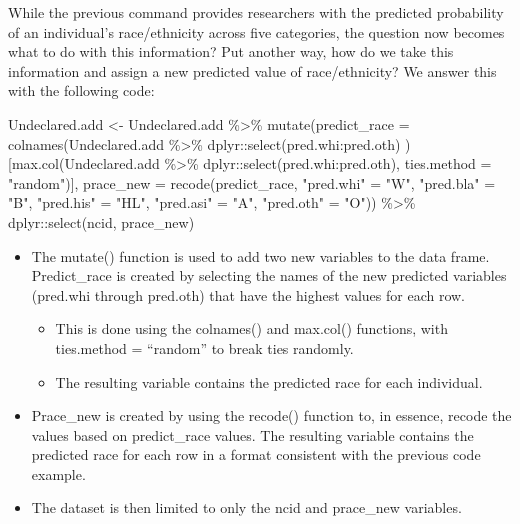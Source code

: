 \documentclass[
]{article}
\newenvironment{Shaded}{}{}
\newcommand{\AttributeTok}[1]{#1}
\newcommand{\FunctionTok}[1]{#1}
\newcommand{\NormalTok}[1]{#1}
\newcommand{\OtherTok}[1]{\textcolor[rgb]{1.00,0.25,0.00}{#1}}
\newcommand{\SpecialCharTok}[1]{\textcolor[rgb]{0.00,0.50,0.50}{#1}}
\newcommand{\StringTok}[1]{\textcolor[rgb]{0.00,0.50,0.50}{#1}}
\providecommand{\tightlist}{%
  \setlength{\itemsep}{0pt}\setlength{\parskip}{0pt}}
\begin{document}
While the previous command provides researchers with the predicted
probability of an individual's race/ethnicity across five categories,
the question now becomes what to do with this information? Put another
way, how do we take this information and assign a new predicted value of
race/ethnicity? We answer this with the following code:

\begin{Shaded}
\begin{Highlighting}[]
\NormalTok{Undeclared.add }\OtherTok{\textless{}{-}}\NormalTok{ Undeclared.add }\SpecialCharTok{\%\textgreater{}\%} 
  \FunctionTok{mutate}\NormalTok{(}\AttributeTok{predict\_race =} \FunctionTok{colnames}\NormalTok{(Undeclared.add }\SpecialCharTok{\%\textgreater{}\%} 
\NormalTok{         dplyr}\SpecialCharTok{::}\FunctionTok{select}\NormalTok{(pred.whi}\SpecialCharTok{:}\NormalTok{pred.oth) )[}\FunctionTok{max.col}\NormalTok{(Undeclared.add }\SpecialCharTok{\%\textgreater{}\%} 
\NormalTok{         dplyr}\SpecialCharTok{::}\FunctionTok{select}\NormalTok{(pred.whi}\SpecialCharTok{:}\NormalTok{pred.oth), }\AttributeTok{ties.method =} \StringTok{"random"}\NormalTok{)],}
         \AttributeTok{prace\_new =} \FunctionTok{recode}\NormalTok{(predict\_race, }
                      \StringTok{"pred.whi"} \OtherTok{=} \StringTok{"W"}\NormalTok{,}
                      \StringTok{"pred.bla"} \OtherTok{=} \StringTok{"B"}\NormalTok{,}
                      \StringTok{"pred.his"} \OtherTok{=} \StringTok{"HL"}\NormalTok{,}
                      \StringTok{"pred.asi"} \OtherTok{=} \StringTok{"A"}\NormalTok{,}
                      \StringTok{"pred.oth"} \OtherTok{=} \StringTok{"O"}\NormalTok{)) }\SpecialCharTok{\%\textgreater{}\%}
\NormalTok{  dplyr}\SpecialCharTok{::}\FunctionTok{select}\NormalTok{(ncid, prace\_new)}
\end{Highlighting}
\end{Shaded}

\begin{itemize}
\tightlist
\item
  The mutate() function is used to add two new variables to the data
  frame. Predict\_race is created by selecting the names of the new
  predicted variables (pred.whi through pred.oth) that have the highest
  values for each row.

  \begin{itemize}
  \tightlist
  \item
    This is done using the colnames() and max.col() functions, with
    ties.method = ``random'' to break ties randomly.
  \item
    The resulting variable contains the predicted race for each
    individual.
  \end{itemize}
\item
  Prace\_new is created by using the recode() function to, in essence,
  recode the values based on predict\_race values. The resulting
  variable contains the predicted race for each row in a format
  consistent with the previous code example.
\item
  The dataset is then limited to only the ncid and prace\_new variables.
\end{itemize}
\end{document}
